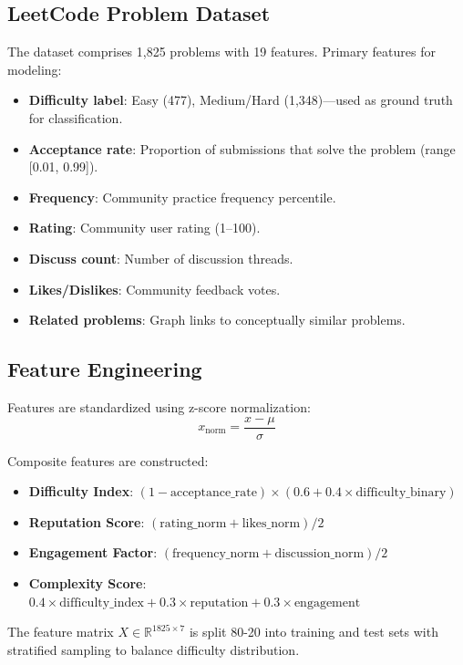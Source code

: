 \documentclass[conference]{IEEEtran}
\begin{document}
\subsection{LeetCode Problem Dataset}
The dataset comprises 1,825 problems with 19 features. Primary features for modeling:
\begin{itemize}
    \item \textbf{Difficulty label}: Easy (477), Medium/Hard (1,348)—used as ground truth for classification.
    \item \textbf{Acceptance rate}: Proportion of submissions that solve the problem (range [0.01, 0.99]).
    \item \textbf{Frequency}: Community practice frequency percentile.
    \item \textbf{Rating}: Community user rating (1--100).
    \item \textbf{Discuss count}: Number of discussion threads.
    \item \textbf{Likes/Dislikes}: Community feedback votes.
    \item \textbf{Related problems}: Graph links to conceptually similar problems.
\end{itemize}

\subsection{Feature Engineering}
Features are standardized using z-score normalization:
\begin{equation}
x_{\text{norm}} = \frac{x - \mu}{\sigma}
\end{equation}

Composite features are constructed:
\begin{itemize}
    \item \textbf{Difficulty Index}: $(1 - \text{acceptance\_rate}) \times (0.6 + 0.4 \times \text{difficulty\_binary})$
    \item \textbf{Reputation Score}: $(\text{rating\_norm} + \text{likes\_norm}) / 2$
    \item \textbf{Engagement Factor}: $(\text{frequency\_norm} + \text{discussion\_norm}) / 2$
    \item \textbf{Complexity Score}: $0.4 \times \text{difficulty\_index} + 0.3 \times \text{reputation} + 0.3 \times \text{engagement}$
\end{itemize}

The feature matrix $X \in \mathbb{R}^{1825 \times 7}$ is split 80-20 into training and test sets with stratified sampling to balance difficulty distribution.
\end{document}
